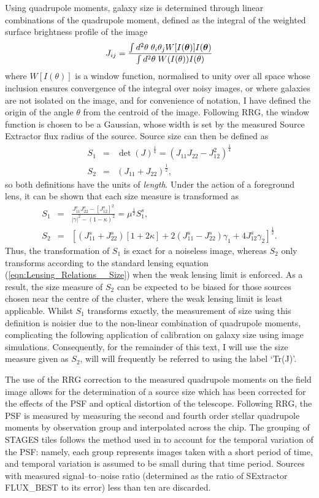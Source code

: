 \documentclass[useAMS,usenatbib,times,letter,amssymb]{mn2e}
\def\be{\begin{equation}}
\def\ee{\end{equation}}
\def\bea{\begin{eqnarray}}
\def\eea{\end{eqnarray}}
\newcommand{\bm}[1]{\mbox{\boldmath{$#1$}}}   %
\begin{document}
Using quadrupole moments, galaxy size is determined through linear combinations of the quadrupole moment, defined as the integral of the weighted surface brightness profile of the image
\be\label{eqn:QuadMoment_SBWeight}
J_{ij} = \frac{\int d^2\theta \;\theta_i \theta_j W[I(\bm{\theta})]I(\bm{\theta})}{\int d^2\theta \;W(I(\theta))I(\theta)}
\ee
where $W[I(\theta)]$ is a window function, normalised to unity over all space whose inclusion ensures convergence of the integral over noisy images, or where galaxies are not isolated on the image, and for convenience of notation, I have defined the origin of  the angle $\theta$ from the centroid of the image. Following RRG, the window function is chosen to be a Gaussian, whose width is set by the measured Source Extractor \citep{Bertin:1996p2806}  flux radius of the source. Source size can then be defined as 
\bea
S_1 &=& \det(J)^{\frac{1}{4}} = (J_{11}J_{22} - J_{12}^2)^{\frac{1}{4}} \label{eqn:quadrupole_SizeMeasurement_detJ}\\
S_2 &=& (J_{11}+J_{22})^{\frac{1}{2}}, \label{eqn:quadrupole_SizeMeasurement_TrJ}
\eea
so both definitions have the units of {\it length}. Under the action of a foreground lens, it can be shown that each size measure is transformed as
\bea
S_1 &=& \frac{J^s_{11}J^s_{22} - [J_{12}^s]^2}{|\gamma|^2 - (1-\kappa)^2} = \mu^{\frac{1}{2}}S_1^s, \\
S_2 &=& [(J^s_{11}+J^s_{22})[1+2\kappa] + 2(J^s_{11}-J^s_{22})\gamma_1 + 4J^s_{12}\gamma_2]^{\frac{1}{2}}.
\eea
Thus, the transformation of $S_1$ is exact for a noiseless image, whereas $S_2$ only transforms according to the standard lensing equation (\ref{eqn:Lensing_Relations__Size}) when the weak lensing limit is enforced. As a result, the size measure of $S_2$ can be expected to be biased for those sources chosen near the centre of the cluster, where the weak lensing limit is least applicable. Whilst $S_1$ transforms exactly, the measurement of size using this definition is noisier due to the non-linear combination of quadrupole moments, complicating the following application of calibration on galaxy size using image simulations. Consequently, for the remainder of this text, I will use the size measure given as $S_2$, will will frequently be referred to using the label `{\rm Tr}(J)'. 

The use of the RRG correction to the measured quadrupole moments on the field image allows for the determination of a source size which has been corrected for the effects of the PSF and optical distortion of the telescope. Following RRG, the PSF is measured by measuring the second and fourth order stellar quadrupole moments by observation group and interpolated across the chip. The grouping of STAGES tiles follows the method used in \cite{Heymans:2005p2573,Heymans:2008p2060} to account for the temporal variation of the PSF: namely, each group represents images taken with a short period of time, and temporal variation is assumed to be small during that time period.  Sources with measured signal--to--noise ratio (determined as the ratio of SExtractor FLUX\_BEST to its error) less than ten are discarded.
\end{document}
